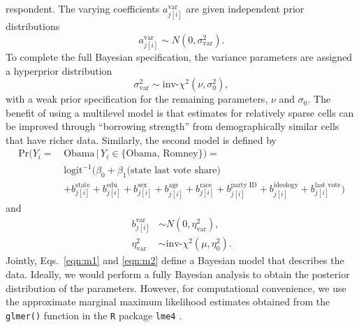 \documentclass[preprint,authoryear,12pt]{elsarticle}
\begin{document}
respondent. The varying coefficients $a_{j[i]}^{\text{var}}$ are given independent prior
distributions \[a^{\text{var}}_{j[i]}\sim N(0,\sigma^2_\text{var}).\] To complete the
full Bayesian specification, the variance parameters are assigned a hyperprior
distribution \[\sigma^2_\text{var}\sim \text{inv-}\chi^2(\nu, \sigma_0^2),\] with a
weak prior specification for the remaining parameters, $\nu$ and $\sigma_0$.
The benefit of using a multilevel model is that estimates for
relatively sparse cells can be improved through ``borrowing strength'' from
demographically similar cells that have richer data. Similarly, the second model
is defined by
\begin{align}  \label{eqn:m2}
  \text{Pr}(Y_i = \, &\text{Obama} \, |\, Y_i\in\{\text{Obama, Romney}\})=\nonumber\\
  &\text{logit}^{-1}\big(\beta_0+ \beta_1\text{(state last vote share)} \\
  & + b^{\text{state}}_{j[i]}+b^{\text{edu}}_{j[i]}+b^{\text{sex}}_{j[i]}+b^{\text{age}}_{j[i]}
  +b^{\text{race}}_{j[i]}+b^{\text{party ID}}_{j[i]} +
  b^{\text{ideology}}_{j[i]} + b^{\text{last vote}}_{j[i]}
 \big)\nonumber
\end{align}
and
\begin{align*}
  b^{\text{var}}_{j[i]}&\sim N(0,\eta^2_\text{var}),\\
  \eta^2_\text{var}&\sim \text{inv-}\chi^2(\mu, \eta_0^2).
\end{align*}
Jointly, Eqs.\ \eqref{eqn:m1} and \eqref{eqn:m2} define a Bayesian model
that describes the data. Ideally, we would perform a fully Bayesian
analysis to obtain the posterior distribution of the parameters. However, for
computational convenience, we use the approximate marginal maximum likelihood
estimates obtained from the \texttt{glmer()} function in the \texttt{R} package
\texttt{lme4} \citep{bates2013lme4}.
\end{document}
